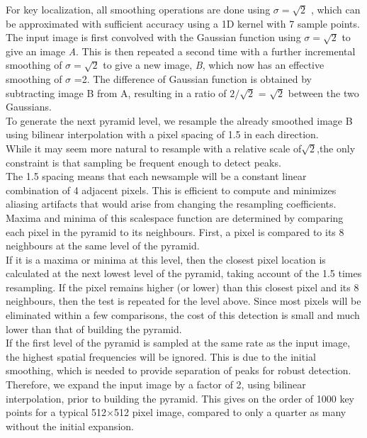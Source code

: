 For key localization, all smoothing operations are done using
$\sigma = \sqrt{2}$ , which can be approximated with sufficient accuracy
using a 1D kernel with 7 sample points.\\
The input image is first convolved with the Gaussian
function using $\sigma = \sqrt{2}$ to give an image \textit{A}. This is then
repeated a second time with a further incremental smoothing
of $\sigma = \sqrt{2}$ to give a new image, \textit{B}, which now has an
effective smoothing of $\sigma$ =2. The difference of Gaussian
function is obtained by subtracting image B from A, resulting
in a ratio of $2/\sqrt{2}$ = $ \sqrt{2}$ between the two Gaussians.\\
To generate the next pyramid level, we resample the already smoothed image B using bilinear interpolation with a
pixel spacing of 1.5 in each direction.\\ While it may seem
more natural to resample with a relative scale of$\sqrt{2}$,the
only constraint is that sampling be frequent enough to detect
peaks.\\ The 1.5 spacing means that each newsample will
be a constant linear combination of 4 adjacent pixels. This
is efficient to compute and minimizes aliasing artifacts that
would arise from changing the resampling coefficients.\\
Maxima and minima of this scalespace function are determined
by comparing each pixel in the pyramid to its
neighbours. First, a pixel is compared to its 8 neighbours at
the same level of the pyramid.\\ If it is a maxima or minima
at this level, then the closest pixel location is calculated at
the next lowest level of the pyramid, taking account of the
1.5 times resampling. If the pixel remains higher (or lower)
than this closest pixel and its 8 neighbours, then the test is
repeated for the level above. Since most pixels will be eliminated
within a few comparisons, the cost of this detection is
small and much lower than that of building the pyramid.\\
If the first level of the pyramid is sampled at the same rate
as the input image, the highest spatial frequencies will be ignored.
This is due to the initial smoothing, which is needed
to provide separation of peaks for robust detection. Therefore,
we expand the input image by a factor of 2, using bilinear
interpolation, prior to building the pyramid. This gives
on the order of 1000 key points for a typical
512$\times$512 pixel
image, compared to only a quarter as many without the initial
expansion.

